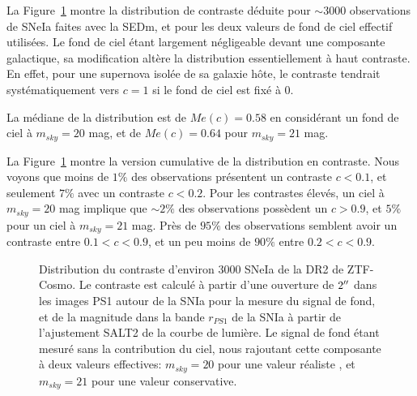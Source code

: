 \documentclass[../main/main.tex]{subfiles}
\begin{document}
La Figure~\ref{fig:dr2contrast} montre la distribution de contraste
déduite pour $\sim3000$ observations de SNeIa faites avec la SEDm, et
pour les deux valeurs de fond de ciel effectif utilisées. Le fond de
ciel étant largement négligeable devant une composante galactique, sa
modification altère la distribution essentiellement à haut contraste. En
effet, pour une supernova isolée de sa galaxie hôte, le contraste
tendrait systématiquement vers $c=1$ si le fond de ciel est fixé à $0$.

La médiane de la distribution est de $Me(c)=0.58$ en considérant un fond de
ciel à $m_{sky}=20$ mag, et de $Me(c)=0.64$ pour $m_{sky}=21$ mag.

La Figure~\ref{fig:dr2contrast} montre la version cumulative de la
distribution en contraste.
Nous voyons que moins de $1\%$ des observations présentent un
contraste $c<0.1$, et seulement $7\%$ avec un contraste $c<0.2$. Pour
les contrastes élevés, un ciel à $m_{sky}=20$ mag implique que $\sim2\%$ des
observations possèdent un $c>0.9$, et $5\%$ pour un ciel à $m_{sky}=21$ mag.
Près de $95\%$ des observations semblent avoir un
contraste entre $0.1<c<0.9$, et un peu moins de $90\%$ entre $0.2<c<0.9$.

\begin{figure}[ht]
  \centering
  \caption[Distribution du contraste des SNeIa de la DR2 de
  ZTF-Cosmo.]{Distribution du contraste d'environ $3000$ SNeIa de la DR2 de
    ZTF-Cosmo. Le contraste est calculé à partir d'une ouverture de
    $2^{\prime\prime}$ dans les images PS1 autour de la SNIa pour la mesure du
    signal de fond, et de la magnitude dans la bande $r_{PS1}$ de la
    SNIa à partir de l'ajustement SALT2 de la courbe de lumière. Le
    signal de fond étant mesuré sans la contribution du ciel, nous
    rajoutant cette composante à deux valeurs effectives: $m_{sky}=20$
    pour une valeur réaliste \citep{SEDM18}, et $m_{sky}=21$ pour une
    valeur conservative.
  }
  \label{fig:dr2contrast}
\end{figure}
\end{document}
